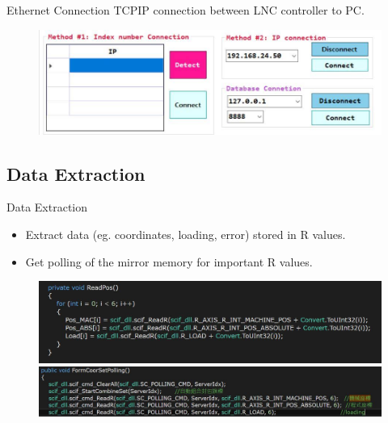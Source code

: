 \documentclass[11pt]{beamer}
\begin{document}
\begin{frame}{Ethernet Connection}
  TCPIP connection between LNC controller to PC.
  \begin{figure}
    \centering
    \includegraphics[scale=0.35]{ui3.jpg}
  \end{figure}
  \end{frame}

\subsection{Data Extraction}
\begin{frame}{Data Extraction}
\begin{itemize}
  \item Extract data (eg. coordinates, loading, error) stored in R values.
  \item Get polling of the mirror memory for important R values.
\end{itemize}
\begin{figure}
  \centering
  \includegraphics[scale=0.22]{data.jpg}
  \includegraphics[scale=0.25]{data2.jpg}
\end{figure}
\end{frame}
\end{document}
